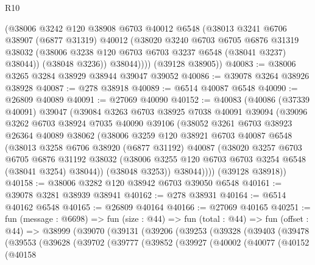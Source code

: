 \begin{lexlean}{R10}
\begin{coremodule}
            (@38006
              @3242
              @120
              @38908
              @6703
              @40012
              @6548
              (@38013
                @3241
                @6706
                @38907
                (@6877 @31319)
                @40012
                (@38020
                  @3240
                  @6703
                  @6705
                  @6876
                  @31319
                  @38032
                  (@38006 @3238 @120 @6703 @6703 @3237 @6548 (@38041 @3237) @38044))
                (@38048 @3236))
              @38044))))
      (@39128 @38905))
@40083 := @38006 @3265 @3284 @38929 @38944 @39047 @39052
@40086 := @39078 @3264 @38926 @38928
@40087 := @278 @38918
@40089 := @6514 @40087 @6548
@40090 := @26809 @40089
@40091 := @27069 @40090
@40152 := @40083
    (@40086
      (@37339 @40091)
      @39047
      (@39084
        @3263
        @6703
        @38925
        @7038
        @40091
        @39094
        (@39096
          @3262
          @6703
          @38924
          @7035
          @40090
          @39106
          (@38052
            @3261
            @6703
            @38923
            @26364
            @40089
            @38062
            (@38006
              @3259
              @120
              @38921
              @6703
              @40087
              @6548
              (@38013
                @3258
                @6706
                @38920
                (@6877 @31192)
                @40087
                (@38020
                  @3257
                  @6703
                  @6705
                  @6876
                  @31192
                  @38032
                  (@38006 @3255 @120 @6703 @6703 @3254 @6548 (@38041 @3254) @38044))
                (@38048 @3253))
              @38044))))
      (@39128 @38918))
@40158 := @38006 @3282 @120 @38942 @6703 @39050 @6548
@40161 := @39078 @3281 @38939 @38941
@40162 := @278 @38931
@40164 := @6514 @40162 @6548
@40165 := @26809 @40164
@40166 := @27069 @40165
@40251 := fun (message : @6698) =>
  fun (size : @44) =>
  fun (total : @44) =>
  fun (offset : @44) =>
  @38999
    (@39070
      (@39131
        (@39206
          (@39253
            (@39328
              (@39403
                (@39478
                  (@39553
                    (@39628
                      (@39702
                        (@39777
                          (@39852
                            (@39927
                              (@40002
                                (@40077
                                  (@40152
                                    (@40158

\end{coremodule}
\end{lexlean}
